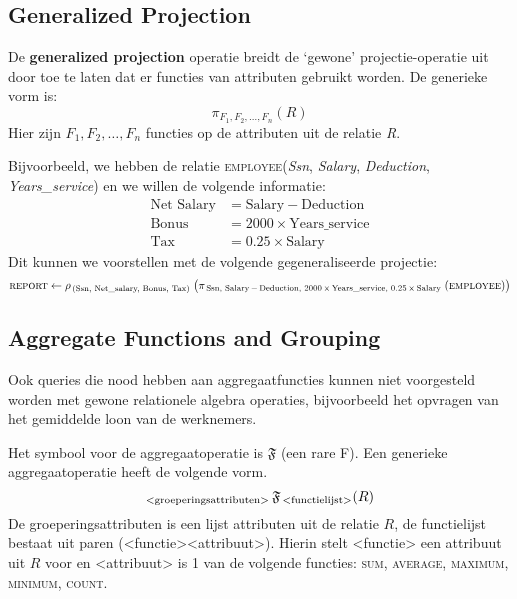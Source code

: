 \subsection{Generalized Projection}
De \textbf{generalized projection} operatie breidt de `gewone' projectie-operatie uit door toe te laten dat er functies van attributen gebruikt worden. De generieke vorm is:
\vspace{-2mm}
\[ \pi_{F_1,F_2,\dots,F_n}(R) \]
Hier zijn $F_1,F_2,\dots,F_n$ functies op de attributen uit de relatie \textit{R}.

\newpage
\noindent Bijvoorbeeld, we hebben de relatie \textsc{employee}(\textit{Ssn}, \textit{Salary}, \textit{Deduction}, \textit{Years\_service}) en we willen de volgende informatie:
\vspace{-2mm}
\begin{align*}
\text{Net Salary} &= \text{Salary} - \text{Deduction} \\
\text{Bonus} &= 2000 \times \text{Years\_service} \\
\text{Tax} &= 0.25 \times \text{Salary}
\end{align*}
Dit kunnen we voorstellen met de volgende gegeneraliseerde projectie:
\vspace{-2mm}
\[ \textsc{report} \leftarrow \rho_{\,(\text{Ssn, Net\_salary, Bonus, Tax})} \;\big( \pi_{\,\text{Ssn, Salary} \,-\, \text{Deduction, } 2000 \,\times\, \text{Years\_service, } 0.25 \,\times\, \text{Salary}} \;(\textsc{employee})\big) \]


\subsection{Aggregate Functions and Grouping}
Ook queries die nood hebben aan aggregaatfuncties kunnen niet voorgesteld worden met gewone relationele algebra operaties, bijvoorbeeld het opvragen van het gemiddelde loon van de werknemers.

Het symbool voor de aggregaatoperatie is $\mathfrak{F}$ (een rare F). Een generieke aggregaatoperatie heeft de volgende vorm.
\vspace{-2mm}
\[ _\text{{\textless}groeperingsattributen{\textgreater}} \,\mathfrak{F}_{\, \text{{\textless}functielijst{\textgreater}}}(R) \]
De groeperingsattributen is een lijst attributen uit de relatie $R$, de functielijst bestaat uit paren ({\textless}functie{\textgreater}{\textless}attribuut{\textgreater}). Hierin stelt {\textless}functie{\textgreater} een attribuut uit $R$ voor en {\textless}attribuut{\textgreater} is 1 van de volgende functies: \textsc{sum}, \textsc{average}, \textsc{maximum}, \textsc{minimum}, \textsc{count}.

